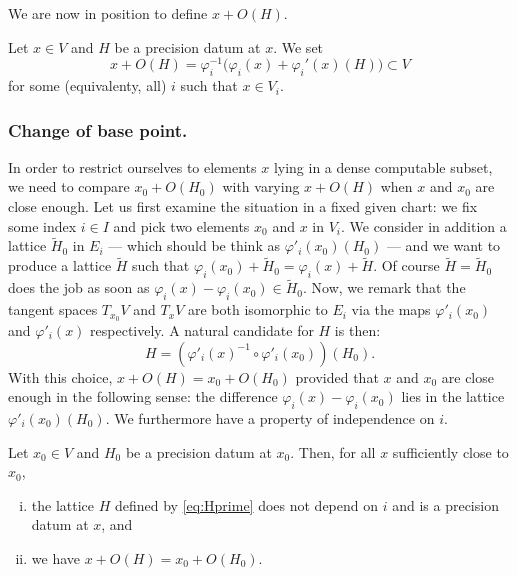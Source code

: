 \documentclass{lms}
\begin{document}
We are now in position to define $x + O(H)$.

\begin{deftn}
Let $x \in V$ and $H$ be a precision datum at $x$. We set
$$x + O(H) = \varphi_i^{-1}\big(\varphi_i(x) + \varphi_i'(x)(H)\big)
\subset V$$
for some (equivalenty, all) $i$ such that $x \in V_i$.
\end{deftn}

\subsubsection*{Change of base point.}

In order to restrict ourselves to elements $x$ lying in a dense 
computable subset, we need to compare $x_0 + O(H_0)$ with varying $x + 
O(H)$ when $x$ and $x_0$ are close enough. Let us first examine the 
situation in a fixed given chart: we fix some index $i \in I$ and pick 
two elements $x_0$ and $x$ in $V_i$. We consider in addition a lattice 
$\tilde H_0$ in $E_i$ --- which should be think as $\varphi'_i(x_0) 
(H_0)$ --- and we want to produce a lattice $\tilde H$ such that 
$\varphi_i(x_0) + \tilde H_0 = \varphi_i(x) + \tilde H$. Of course 
$\tilde H = \tilde H_0$ does the job as soon as 
$\varphi_i(x) - \varphi_i(x_0) \in \tilde H_0$. 
Now, we remark that the tangent spaces $T_{x_0} V$ and $T_x V$ are both 
isomorphic to $E_i$ via the maps $\varphi'_i(x_0)$ and $\varphi'_i(x)$ 
respectively. A natural candidate for $H$ is then:
\begin{equation}
\label{eq:Hprime}
H = \left(\varphi'_i(x)^{-1} \circ \varphi'_i(x_0)\right) (H_0).
\end{equation}
With this choice, $x + O(H) = x_0 + O(H_0)$ provided that $x$ and $x_0$ 
are close enough in the following sense: the difference $\varphi_i(x) - 
\varphi_i(x_0)$ lies in the lattice $\varphi'_i(x_0)(H_0)$. We 
furthermore have a property of independence on $i$.

\begin{prop}
Let $x_0 \in V$ and $H_0$ be a precision datum at $x_0$.
Then, for all $x$ sufficiently close to $x_0$,
\begin{enumerate}[(i)]
\item the lattice $H$ defined by \eqref{eq:Hprime} does not depend 
on $i$ and is a precision datum at $x$, and
\item we have $x + O(H) = x_0 + O(H_0)$.
\end{enumerate}
\end{prop}
\end{document}
